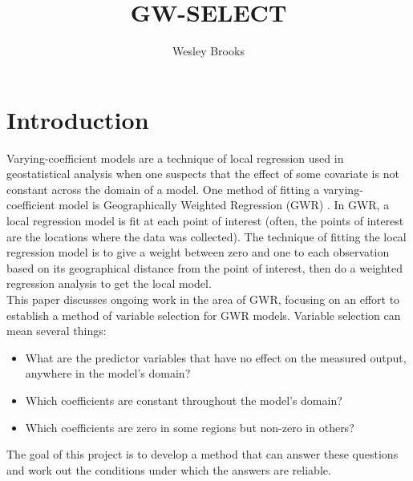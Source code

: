 \documentclass[10pt]{amsart}
\title{GW-SELECT}
\author{Wesley Brooks}
\date{}                                           %
\begin{document}
\maketitle





\section{Introduction}
	Varying-coefficient models are a technique of local regression used in geostatistical analysis when one suspects that the effect of some covariate is not constant across the domain of a model. One method of fitting a varying-coefficient model is Geographically Weighted Regression (GWR) \cite{Fotheringham:2002}. In GWR, a local regression model is fit at each point of interest (often, the points of interest are the locations where the data was collected). The technique of fitting the local regression model is to give a weight between zero and one to each observation based on its geographical distance from the point of interest, then do a weighted regression analysis to get the local model.\\

	This paper discusses ongoing work in the area of GWR, focusing on an effort to establish a method of variable selection for GWR models. Variable selection can mean several things:\\

	\begin{itemize}
		\item What are the predictor variables that have no effect on the measured output, anywhere in the model's domain?\\
		\item Which coefficients are constant throughout the model's domain?\\
		\item Which coefficients are zero in some regions but non-zero in others?\\
	\end{itemize}

	The goal of this project is to develop a method that can answer these questions and work out the conditions under which the answers are reliable.\\
\end{document}
